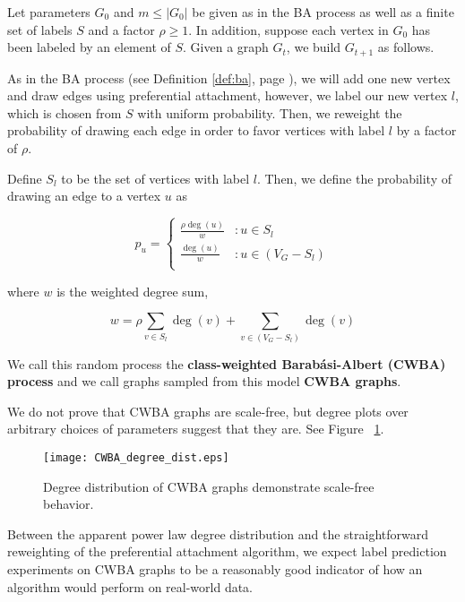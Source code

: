 \begin{definition}
  Let parameters $G_0$ and $m \leq |G_0|$ be given as in the BA process as well
  as a finite set of labels $S$ and a factor $\rho \ge 1$. In addition, suppose
  each vertex in $G_0$ has been labeled by an element of $S$. Given a graph
  $G_t$, we build $G_{t+1}$ as follows.

  As in the BA process (see Definition \ref{def:ba}, page \pageref{def:ba}), we will add one new vertex and draw
  edges using preferential attachment, however, we label our new vertex $l$, which is chosen from $S$
  with uniform probability. Then, we reweight the probability of drawing each edge in order to favor
  vertices with label $l$ by a factor of $\rho$.

  Define $S_l$ to be the set of vertices with label $l$. Then, we define the
  probability of drawing an edge to a vertex $u$ as

  \[
    p_u = \begin{cases}
      \frac{\rho\deg(u)}{w} &: u \in S_l\\
      
      \frac{\deg(u)}{w} &: u \in (V_G - S_l)\\
    \end{cases}
  \]

  where $w$ is the weighted degree sum,

  \[
    w = \rho \sum_{v \in S_l}\deg(v) + \sum_{v \in (V_G - S_l)}\deg(v)
  \]

  We call this random process the \textbf{class-weighted Barab\'asi-Albert
    (CWBA) process} and we call graphs sampled from this model \textbf{CWBA
    graphs}.

\end{definition}

We do not prove that CWBA graphs are scale-free, but degree plots over arbitrary choices of
parameters suggest that they are. See Figure ~\ref{fig:cwba_degs}.

\begin{figure}[H]
  \centering
  \texttt{[image: CWBA\_degree\_dist.eps]}
  \caption{Degree distribution of CWBA graphs demonstrate scale-free behavior.}
  \label{fig:cwba_degs}
\end{figure}

Between the apparent power law degree distribution and the straightforward reweighting of the
preferential attachment algorithm, we expect label prediction experiments on CWBA graphs to be a
reasonably good indicator of how an algorithm would perform on real-world data.


